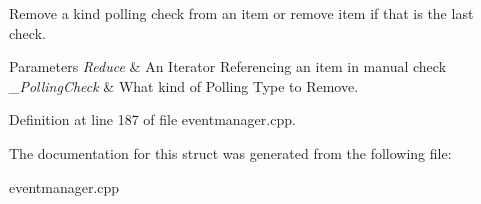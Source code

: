 Remove a kind polling check from an item or remove item if that is the last check. 


\begin{DoxyParams}{Parameters}
{\em Reduce} & An Iterator Referencing an item in manual check \\
\hline
{\em \_\-PollingCheck} & What kind of Polling Type to Remove. \\
\hline
\end{DoxyParams}


Definition at line 187 of file eventmanager.cpp.



The documentation for this struct was generated from the following file:\begin{DoxyCompactItemize}
\item 
eventmanager.cpp\end{DoxyCompactItemize}
